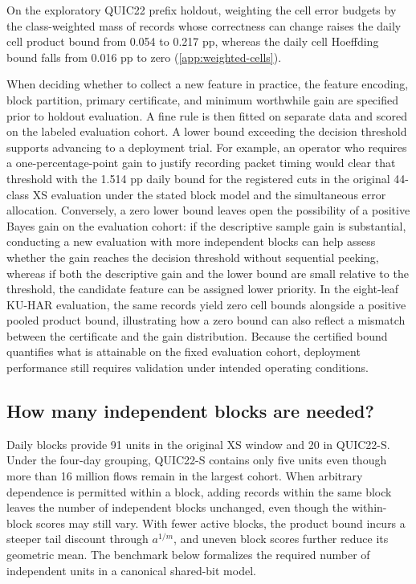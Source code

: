 \documentclass[preprint,11pt]{elsarticle}
\begin{document}
On the exploratory QUIC22 prefix holdout, weighting the cell error budgets by the class-weighted mass of records whose correctness can change raises the daily cell product bound from 0.054 to 0.217 pp, whereas the daily cell Hoeffding bound falls from 0.016 pp to zero (\ref{app:weighted-cells}).

When deciding whether to collect a new feature in practice, the feature encoding, block partition, primary certificate, and minimum worthwhile gain are specified prior to holdout evaluation. A fine rule is then fitted on separate data and scored on the labeled evaluation cohort. A lower bound exceeding the decision threshold supports advancing to a deployment trial. For example, an operator who requires a one-percentage-point gain to justify recording packet timing would clear that threshold with the 1.514 pp daily bound for the registered cuts in the original 44-class XS evaluation under the stated block model and the simultaneous error allocation. Conversely, a zero lower bound leaves open the possibility of a positive Bayes gain on the evaluation cohort: if the descriptive sample gain is substantial, conducting a new evaluation with more independent blocks can help assess whether the gain reaches the decision threshold without sequential peeking, whereas if both the descriptive gain and the lower bound are small relative to the threshold, the candidate feature can be assigned lower priority. In the eight-leaf KU-HAR evaluation, the same records yield zero cell bounds alongside a positive pooled product bound, illustrating how a zero bound can also reflect a mismatch between the certificate and the gain distribution. Because the certified bound quantifies what is attainable on the fixed evaluation cohort, deployment performance still requires validation under intended operating conditions.

\subsection{How many independent blocks are needed?}
\label{sec:block-budget}

Daily blocks provide 91 units in the original XS window and 20 in QUIC22-S. Under the four-day grouping, QUIC22-S contains only five units even though more than 16 million flows remain in the largest cohort. When arbitrary dependence is permitted within a block, adding records within the same block leaves the number of independent blocks unchanged, even though the within-block scores may still vary. With fewer active blocks, the product bound incurs a steeper tail discount through $a^{1/m}$, and uneven block scores further reduce its geometric mean. The benchmark below formalizes the required number of independent units in a canonical shared-bit model.
\end{document}
